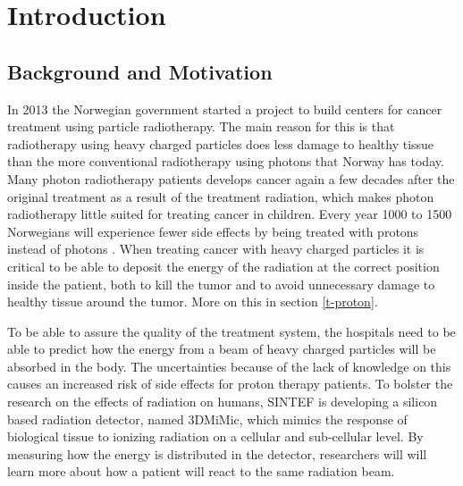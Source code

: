 \documentclass[../main/thesis.tex]{subfiles}
\begin{document}
\newpage

\chapter{Introduction}
\label{intro}
\section{Background and Motivation}
\label{i-background}
In 2013 the Norwegian government started a project to build centers for cancer treatment using particle radiotherapy. The main reason for this is that radiotherapy using heavy charged particles does less damage to healthy tissue than the more conventional radiotherapy using photons that Norway has today. Many photon radiotherapy patients develops cancer again a few decades after the original treatment as a result of the treatment radiation, which makes photon radiotherapy little suited for treating cancer in children. Every year 1000 to 1500 Norwegians will experience fewer side effects by being treated with protons instead of photons \citep{uio2012}. When treating cancer with heavy charged particles it is critical to be able to deposit the energy of the radiation at the correct position inside the patient, both to kill the tumor and to avoid unnecessary damage to healthy tissue around the tumor. More on this in section \ref{t-proton}.


To be able to assure the quality of the treatment system, the hospitals need to be able to predict how the energy from a beam of heavy charged particles will be absorbed in the body. The uncertainties because of the lack of knowledge on this causes an increased risk of side effects for proton therapy patients. To bolster the research on the effects of radiation on humans, SINTEF is developing a silicon based radiation detector, named 3DMiMic, which mimics the response of biological tissue to ionizing radiation on a cellular and sub-cellular level. By measuring how the energy is distributed in the detector, researchers will will learn more about how a patient will react to the same radiation beam. \citep{sintef3dmimic}
\end{document}
